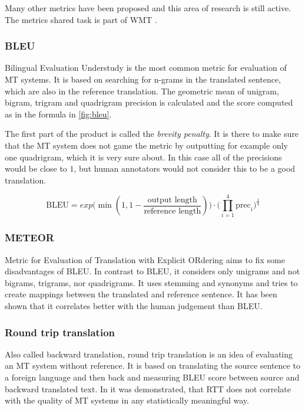 Many other metrics have been proposed and this area of research is still active. The metrics shared task is part of WMT \citep{wmt19_metrics}.

\subsubsection{BLEU}
Bilingual Evaluation Understudy \citep{bleu} is the most common metric for evaluation of MT systems. It is based on searching for n-grams in the translated sentence, which are also in the reference translation. The geometric mean of unigram, bigram, trigram and quadrigram precision is calculated and the score computed as in the formula in \cref{fig:bleu}. 

The first part of the product is called the \textit{brevity penalty}. It is there to make sure that the MT system does not game the metric by outputting for example only one quadrigram, which it is very sure about. In this case all of the precisions would be close to $1$, but human annotators would not consider this to be a good translation.

\begin{equation}
    \text{BLEU} = exp\big(\min(1, 1-\frac{\text{output length}}{\text{reference length}})\big) \cdot \big(\prod_{i=1}^4 \text{prec}_i\big)^\frac{1}{4}  
    \label{fig:bleu}
\end{equation}

\subsubsection{METEOR}
Metric for Evaluation of Translation with Explicit ORdering aims to fix some disadvantages of BLEU. In contrast to BLEU, it considers only unigrams and not bigrams, trigrams, nor quadrigrams. It uses stemming and synonyms and tries to create mappings between the translated and reference sentence. It has been shown \citep{meteor} that it correlates better with the human judgement than BLEU.

\subsubsection{Round trip translation}

Also called backward translation, round trip translation is an idea of evaluating an MT system without reference. It is based on translating the source sentence to a foreign language and then back and measuring BLEU score between source and backward translated text. In \citep{rtt_what_is_it_good_for} it was demonstrated, that RTT does not correlate with the quality of MT systems in any statistically meaningful way.

